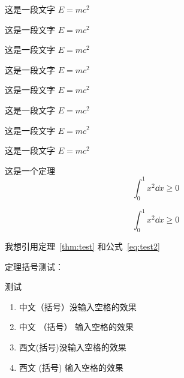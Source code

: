 \begin{corollary}
  这是一段文字 $E = m c^2$
\end{corollary}

\begin{lemma}
  这是一段文字 $E = m c^2$
\end{lemma}

\begin{axiom}
  这是一段文字 $E = m c^2$
\end{axiom}

\begin{antiexample}
  这是一段文字 $E = m c^2$
\end{antiexample}

\begin{conjecture}
  这是一段文字 $E = m c^2$
\end{conjecture}

\begin{question}
  这是一段文字 $E = m c^2$
\end{question}

\begin{claim}
  这是一段文字 $E = m c^2$
\end{claim}

\begin{remark}
  这是一段文字 $E = m c^2$
\end{remark}

\begin{theorem}[Cauchy]\label{thm:test}
  这是一个定理
  \begin{equation}\label{eq:test1}
    \int_{0}^{1} x^2 \dd{x} \geq 0
  \end{equation}

  \begin{equation}\label{eq:test2}
    \int_{0}^{1} x^2 \dd{x} \geq 0
  \end{equation}
\end{theorem}

我想引用定理~\ref{thm:test} 和公式~\ref{eq:test2}


定理括号测试：

\begin{theorem}
  测试
  \begin{enumerate}
    \item 中文（括号）没输入空格的效果
    \item 中文 （括号） 输入空格的效果
    \item 西文(括号)没输入空格的效果
    \item 西文 (括号) 输入空格的效果
  \end{enumerate}
\end{theorem} 


